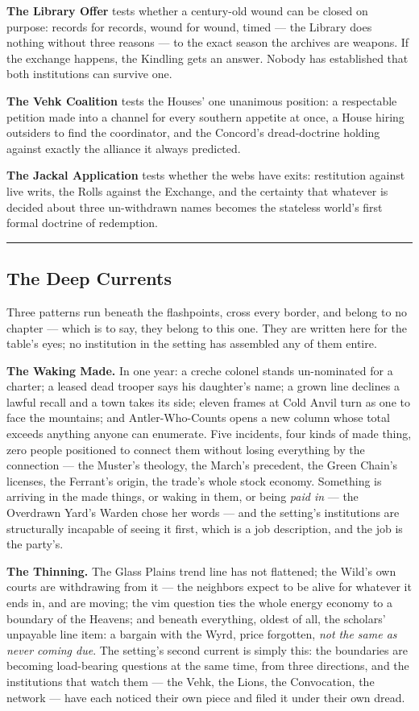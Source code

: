 \textbf{The Library Offer} tests whether a century-old wound can be closed on purpose: records for records, wound for wound, timed --- the Library does nothing without three reasons --- to the exact season the archives are weapons. If the exchange happens, the Kindling gets an answer. Nobody has established that both institutions can survive one.

\textbf{The Vehk Coalition} tests the Houses' one unanimous position: a respectable petition made into a channel for every southern appetite at once, a House hiring outsiders to find the coordinator, and the Concord's dread-doctrine holding against exactly the alliance it always predicted.

\textbf{The Jackal Application} tests whether the webs have exits: restitution against live writs, the Rolls against the Exchange, and the certainty that whatever is decided about three un-withdrawn names becomes the stateless world's first formal doctrine of redemption.

\medskip\hrule\medskip

\subsection{The Deep Currents}

Three patterns run beneath the flashpoints, cross every border, and belong to no chapter --- which is to say, they belong to this one. They are written here for the table's eyes; no institution in the setting has assembled any of them entire.

\textbf{The Waking Made.} In one year: a creche colonel stands un-nominated for a charter; a leased dead trooper says his daughter's name; a grown line declines a lawful recall and a town takes its side; eleven frames at Cold Anvil turn as one to face the mountains; and Antler-Who-Counts opens a new column whose total exceeds anything anyone can enumerate. Five incidents, four kinds of made thing, zero people positioned to connect them without losing everything by the connection --- the Muster's theology, the March's precedent, the Green Chain's licenses, the Ferrant's origin, the trade's whole stock economy. Something is arriving in the made things, or waking in them, or being \textit{paid in} --- the Overdrawn Yard's Warden chose her words --- and the setting's institutions are structurally incapable of seeing it first, which is a job description, and the job is the party's.

\textbf{The Thinning.} The Glass Plains trend line has not flattened; the Wild's own courts are withdrawing from it --- the neighbors expect to be alive for whatever it ends in, and are moving; the vim question ties the whole energy economy to a boundary of the Heavens; and beneath everything, oldest of all, the scholars' unpayable line item: a bargain with the Wyrd, price forgotten, \textit{not the same as never coming due}. The setting's second current is simply this: the boundaries are becoming load-bearing questions at the same time, from three directions, and the institutions that watch them --- the Vehk, the Lions, the Convocation, the network --- have each noticed their own piece and filed it under their own dread.


